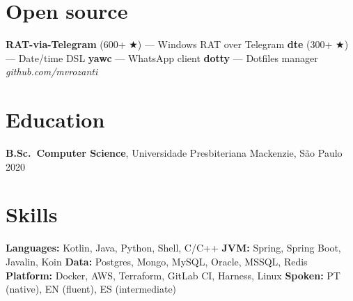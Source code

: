 \documentclass[10pt,a4paper]{article}
\begin{document}
\section{Open source}
\textbf{RAT-via-Telegram} (600+ ★) — Windows RAT over Telegram \quad
\textbf{dte} (300+ ★) — Date/time DSL \quad
\textbf{yawc} — WhatsApp client \quad
\textbf{dotty} — Dotfiles manager \quad
\textit{github.com/mvrozanti}

\section{Education}
\noindent\textbf{B.Sc.\ Computer Science}, Universidade Presbiteriana Mackenzie, São Paulo \hfill 2020

\section{Skills}
\textbf{Languages:} Kotlin, Java, Python, Shell, C/C++ \quad
\textbf{JVM:} Spring, Spring Boot, Javalin, Koin \quad
\textbf{Data:} Postgres, Mongo, MySQL, Oracle, MSSQL, Redis \quad
\textbf{Platform:} Docker, AWS, Terraform, GitLab CI, Harness, Linux \quad
\textbf{Spoken:} PT (native), EN (fluent), ES (intermediate)
\end{document}
